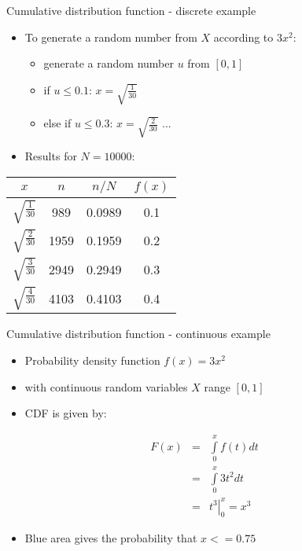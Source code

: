 \begin{slide}[toc=]{Cumulative distribution function - discrete example}
\null\vfill
  
 \begin{itemize}
  \item To generate a random number from $X$ according to $3x^2$:
  \begin{itemize}
    \item generate a random number $u$ from $[0, 1]$
    \item if $u \leq 0.1$: $x = \sqrt{\frac{1}{30}}$
    \item else if $u \leq 0.3$: $x = \sqrt{\frac{2}{30}}$ ...
  \end{itemize}
  \item Results for $N = 10000$:
 \end{itemize}

 \begin{center}
 \begin{tabular}{c|c|c|c}
$x$ & $n$ & $n/N$ & $f(x)$ \\ \hline 
$\sqrt{\frac{1}{30}}$ &  989  & 0.0989 & 0.1 \\
$\sqrt{\frac{2}{30}}$ & 1959 & 0.1959 & 0.2 \\
$\sqrt{\frac{3}{30}}$ & 2949 & 0.2949 & 0.3 \\
$\sqrt{\frac{4}{30}}$ & 4103 & 0.4103 & 0.4 \\
 \end{tabular}
 \end{center}
 
\vfill\null
\end{slide}

\begin{slide}[toc=CDF continuous]{Cumulative distribution function - continuous example}
\null\vfill

  \begin{itemize}
    
    \item Probability density function $f(x) = 3x^2$
    \item[] with continuous random variables $X$ range $[0, 1]$
    \item CDF is given by:
    
  \end{itemize}
  
  \twocolumn
  {
    \begin{eqnarray*}
      F (x) & = & \int\limits_0^x f(t) dt \\
            & = & \int\limits_0^x 3t^2 dt \\
            & = & \left.t^3\right|_0^x = x^3
    \end{eqnarray*}
  }
  {
    
  }
  
  \begin{itemize}
  
    \item Blue area gives the probability that $x <= 0.75$
    
  \end{itemize}

\vfill\null
\end{slide}

